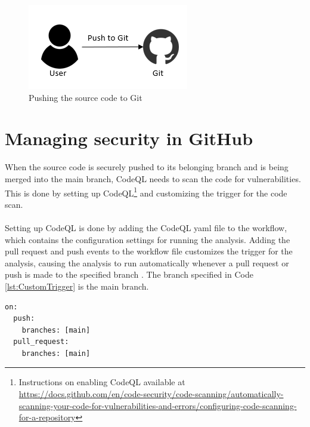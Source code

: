\vspace{2mm}
\begin{figure}[H]
    \centering
    \includegraphics[width=0.5\columnwidth]{Images/aws-piplin-1.png}
    \caption{Pushing the source code to Git}
    \label{fig: Pushing the source code to Git}
\end{figure}

\section{Managing security in GitHub}
\label{Managing security in GitHub}
When the source code is securely pushed to its belonging branch and is being merged into the main branch, CodeQL needs to scan the code for vulnerabilities. This is done by setting up CodeQL\footnote{Instructions on enabling CodeQL available at \url{https://docs.github.com/en/code-security/code-scanning/automatically-scanning-your-code-for-vulnerabilities-and-errors/configuring-code-scanning-for-a-repository}} and customizing the trigger for the code scan. 
\\~\\
Setting up CodeQL is done by adding the CodeQL \acrshort{yaml} file to the workflow, which contains the configuration settings for running the analysis. Adding the pull request and push events to the workflow file customizes the trigger for the analysis, causing the analysis to run automatically whenever a pull request or push is made to the specified branch \cite{CodeQLCustom}. The branch specified in Code \ref{lst:CustomTrigger} is the main branch. 

\vspace{2mm}
\begin{lstlisting}[language=terraform, caption=Custom trigger for CodeQL alerts, captionpos=b, frame=single, label=lst:CustomTrigger]
on:
  push:
    branches: [main]
  pull_request:
    branches: [main]
\end{lstlisting}

